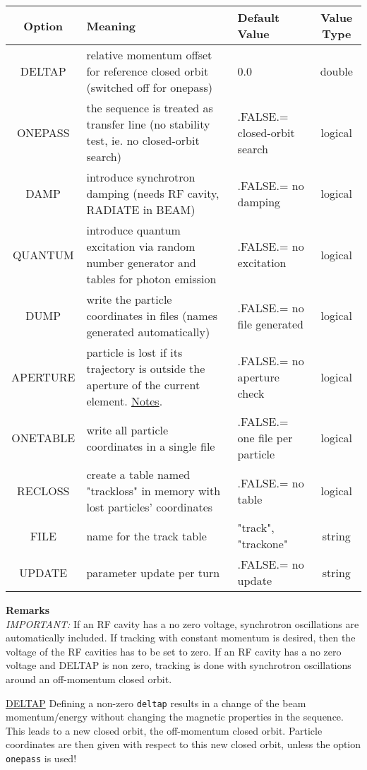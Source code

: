 \begin{tabular}{c p{5cm} p{3cm} c}
  \hline 
  \textbf{Option} & \textbf{Meaning} & \textbf{Default Value} &
  \textbf{Value Type} \\  
  \hline
  DELTAP & relative momentum offset for reference closed orbit (switched
  off for onepass) &  0.0 & double \\  
  \hline
  ONEPASS & the sequence is treated as transfer line (no stability test,
  ie. no closed-orbit search) & .FALSE.= closed-orbit search & logical
  \\  
  \hline
  DAMP & introduce synchrotron damping (needs RF cavity, RADIATE in
  BEAM)  & .FALSE.= no damping & logical \\  
  \hline
  QUANTUM & introduce quantum excitation via random number generator and
  tables for photon emission & .FALSE.= no excitation & logical \\  
  \hline
  DUMP & write the particle coordinates in files (names generated
  automatically)  & .FALSE.= no file generated & logical \\  
  \hline
  APERTURE & particle is lost if its trajectory is outside the aperture
  of the current
  element. \hyperlink{track:remarks:aperture:notes}{Notes}. & .FALSE.=
  no aperture check & logical \\  
  \hline
  ONETABLE & write all particle coordinates in a single file & .FALSE.=
  one file per particle & logical \\  
  \hline
  RECLOSS & create a table named "trackloss" in memory with lost
  particles' coordinates & .FALSE.= no table & logical \\  
  \hline
  FILE & name for the track table   & "track", "trackone" & string \\ 
  \hline
  UPDATE & parameter update per turn   & .FALSE.= no update & string \\  
  \hline
\end{tabular}
          
{\bf Remarks}\\
\emph{IMPORTANT:} If an RF cavity has a no zero voltage, synchrotron
oscillations are automatically included. If tracking with constant
momentum is desired, then the voltage of the RF cavities has to be set
to zero. If an RF cavity has a no zero voltage and DELTAP is non zero, 
tracking is done with synchrotron oscillations around an off-momentum
closed orbit.
          
          
\href{track:remarks:deltap:notes}{DELTAP}
Defining a non-zero \texttt{deltap} results in a change of the beam
momentum/energy without changing the magnetic properties in the
sequence. This leads to a new closed orbit, the off-momentum closed
orbit. Particle coordinates are then given with respect to this new
closed orbit, unless the option \texttt{onepass} is used!


